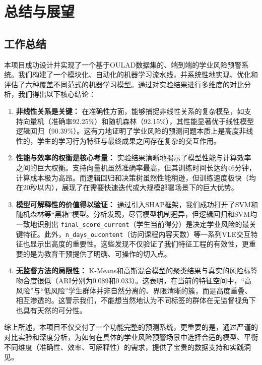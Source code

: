 \documentclass{SYSUReport}
\begin{document}
\section{总结与展望}
\subsection{工作总结}
本项目成功设计并实现了一个基于OULAD数据集的、端到端的学业风险预警系统。我们构建了一个模块化、自动化的机器学习流水线，并系统性地实现、优化和评估了六种覆盖不同范式的机器学习模型。通过对实验结果进行多维度的对比分析，我们得出以下核心结论：

\begin{enumerate}
    \item \textbf{非线性关系是关键：} 在准确性方面，能够捕捉非线性关系的复杂模型，如支持向量机（准确率92.25\%）和随机森林（92.15\%），其性能显著优于线性模型逻辑回归（90.39\%）。这有力地证明了学业风险的预测问题本质上是高度非线性的，学生的学习行为特征与最终成果之间存在复杂的交互作用。

    \item \textbf{性能与效率的权衡是核心考量：} 实验结果清晰地揭示了模型性能与计算效率之间的巨大权衡。支持向量机虽然准确率最高，但其训练时间长达约46分钟，计算成本极为高昂。而逻辑回归和决策树虽然性能稍逊，但训练速度极快（均在20秒以内），展现了在需要快速迭代或大规模部署场景下的巨大优势。

    \item \textbf{模型可解释性的价值得以验证：} 通过引入SHAP框架，我们成功打开了SVM和随机森林等“黑箱”模型。分析发现，尽管模型机制迥异，但逻辑回归和SVM均一致地识别出 \texttt{final\_score\_current}（学生当前得分）是决定学业风险的最关键特征。此外，\texttt{n\_days\_oucontent}（访问课程内容天数）等一系列VLE交互特征也显示出高度的重要性。这些发现不仅验证了我们特征工程的有效性，更重要的是为教育干预提供了明确、可操作的切入点。

    \item \textbf{无监督方法的局限性：} K-Means和高斯混合模型的聚类结果与真实的风险标签吻合度很低（ARI分别为0.089和0.033）。这表明，在当前的特征空间中，“高风险”与“低风险”学生群体并非自然分离的、界限清晰的簇，而是高度重叠、相互渗透的。这警示我们，不能想当然地认为不同标签的群体在无监督视角下也具有天然的可分性。
\end{enumerate}

综上所述，本项目不仅交付了一个功能完整的预测系统，更重要的是，通过严谨的对比实验和深度分析，为如何在具体的学业风险预警场景中选择合适的模型、平衡不同维度（准确性、效率、可解释性）的需求，提供了宝贵的数据支持和实践洞见。
\end{document}
